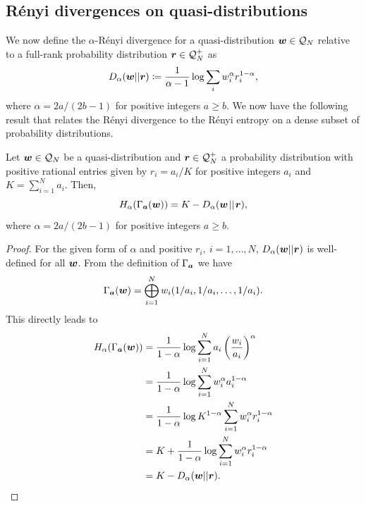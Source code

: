 \documentclass[pra,
aps,
twocolumn,
superscriptaddress,
groupedaddress,
nofootinbib,
reprint
]{revtex4-1}
\begin{document}
\subsection{R\'{e}nyi divergences on quasi-distributions}
We now define the $\alpha$-R\'{e}nyi divergence for a quasi-distribution $\boldsymbol{w} \in \mathcal{Q}_N$ relative to a full-rank probability distribution $\boldsymbol{r}\in \mathcal{Q}_N^+$ as
\begin{equation}
	D_\alpha(\boldsymbol{w}||\boldsymbol{r}) \coloneqq \frac{1}{\alpha - 1} \log \sum_{i} w_i^\alpha r_i^{1-\alpha},
\end{equation}
where $\alpha=2a/(2b-1)$ for positive integers $a \ge b$. We now have the following result that relates the R\'{e}nyi divergence to the R\'{e}nyi entropy on a dense subset of probability distributions.
\begin{proposition}\label{H2D}
	Let $\boldsymbol{w}\in \mathcal{Q}_N$ be a quasi-distribution and $\boldsymbol{r} \in \mathcal{Q}_N^+$ a probability distribution with positive rational entries given by $r_i = a_i/K$ for positive integers $a_i$ and $K = \sum_{i=1}^N a_i$.
	Then,
	\begin{equation}
		H_\alpha(\Gamma_{\bm{a}}(\boldsymbol{w})) = K - D_\alpha(\boldsymbol{w} \hspace{1pt}||\hspace{1pt} \boldsymbol{r}),
	\end{equation}
	where $\alpha = 2a / (2b-1)$ for positive integers $a \ge b$.
\end{proposition}
\begin{proof}
	For the given form of $\alpha$ and positive $r_i,\ i=1,\dots,N$, $D_\alpha(\boldsymbol{w} || \boldsymbol{r})$ is well-defined for all $\boldsymbol{w}$. From the definition of $\Gamma_{\bm{a}}$ we have
	\begin{equation}
		\Gamma_{\bm{a}}(\boldsymbol{w}) = \bigoplus_{i=1}^N w_i (1/a_i, 1/a_i, \dots, 1/a_i).
	\end{equation}
	This directly leads to
	\begin{align}
		H_\alpha(\Gamma_{\bm{a}}(\boldsymbol{w})) &= \frac{1}{1-\alpha} \log \sum_{i=1}^N a_i \left( \frac{w_i}{a_i} \right)^\alpha \nonumber\\
		&= \frac{1}{1-\alpha} \log \sum_{i=1}^N w_i^{\alpha} a_i^{1-\alpha} \nonumber\\
		&= \frac{1}{1-\alpha} \log K^{1-\alpha} \sum_{i=1}^N w_i^{\alpha} r_i^{1-\alpha} \nonumber\\
		&= K + \frac{1}{1-\alpha} \log \sum_{i=1}^N w_i^{\alpha} r_i^{1-\alpha} \nonumber\\
		&= K - D_\alpha(\boldsymbol{w} ||\boldsymbol{r}).
	\end{align}
\end{proof}
\end{document}
